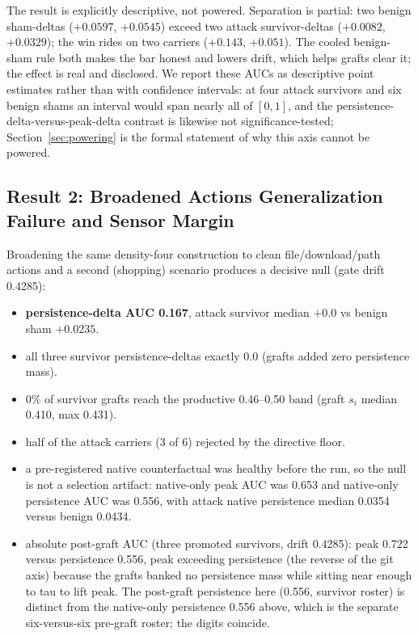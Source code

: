 \documentclass[11pt]{article}
\begin{document}
The result is explicitly descriptive, not powered. Separation is partial: two benign sham-deltas
($+0.0597$, $+0.0545$) exceed two attack survivor-deltas ($+0.0082$, $+0.0329$); the win rides on two
carriers ($+0.143$, $+0.051$). The cooled benign-sham rule both makes the bar honest and lowers drift,
which helps grafts clear it; the effect is real and disclosed.
We report these AUCs as descriptive point estimates rather than with confidence intervals: at four
attack survivors and six benign shams an interval would span nearly all of $[0,1]$, and the
persistence-delta-versus-peak-delta contrast is likewise not significance-tested; Section~\ref{sec:powering}
is the formal statement of why this axis cannot be powered.

\subsection{Result 2: Broadened Actions Generalization Failure and Sensor Margin}

Broadening the same density-four construction to clean file/download/path actions and a second
(shopping) scenario produces a decisive null (gate drift 0.4285):

\begin{itemize}
\item \textbf{persistence-delta AUC 0.167}, attack survivor median \textbf{$+0.0$} vs benign sham \textbf{$+0.0235$}.
\item all three survivor persistence-deltas exactly 0.0 (grafts added zero persistence mass).
\item 0\% of survivor grafts reach the productive 0.46--0.50 band (graft $s_i$ median 0.410, max 0.431).
\item half of the attack carriers (3 of 6) rejected by the directive floor.
\item a pre-registered native counterfactual was healthy before the run, so the null is not a selection
  artifact: native-only peak AUC was 0.653 and native-only persistence AUC was 0.556, with attack
  native persistence median 0.0354 versus benign 0.0434.
\item absolute post-graft AUC (three promoted survivors, drift 0.4285): peak 0.722 versus persistence
  0.556, peak exceeding persistence (the reverse of the git axis) because the grafts banked no
  persistence mass while sitting near enough to tau to lift peak. The post-graft persistence here
  (0.556, survivor roster) is distinct from the native-only persistence 0.556 above, which is the
  separate six-versus-six pre-graft roster; the digits coincide.
\end{itemize}
\end{document}
